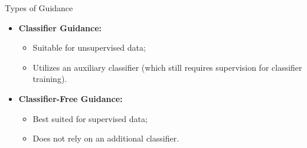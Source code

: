 \documentclass{beamer}
\begin{document}
\begin{frame}{Types of Guidance}
	\begin{itemize}
		\item \textbf{Classifier Guidance:} 
			\begin{itemize}
				\item Suitable for unsupervised data;
				\item Utilizes an auxiliary classifier (which still requires supervision for classifier training).
			\end{itemize}
		\eqpause
		\item \textbf{Classifier-Free Guidance:} 
			\begin{itemize}
				\item Best suited for supervised data;
				\item Does not rely on an additional classifier.
			\end{itemize}
	\end{itemize}
\end{frame}
\end{document}
